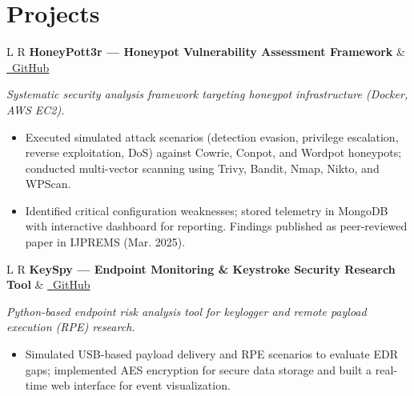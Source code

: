 \documentclass[10pt,a4paper]{article}
\begin{document}
\section{Projects}

\noindent
\begin{tabularx}{\textwidth}{L R}
  \textbf{HoneyPott3r --- Honeypot Vulnerability Assessment Framework} & \href{https://github.com/3rr0r-505/HoneyPott3r}{\textcolor{accent}{\faGithub\ GitHub}} \\
\end{tabularx}
\vspace{1pt}
\textit{\small Systematic security analysis framework targeting honeypot infrastructure (Docker, AWS EC2).}
\begin{itemize}[leftmargin=3.5ex, itemsep=2.5pt, topsep=3pt]
  \small
  \item Executed simulated attack scenarios (detection evasion, privilege escalation, reverse exploitation, DoS) against Cowrie, Conpot, and Wordpot honeypots; conducted multi-vector scanning using Trivy, Bandit, Nmap, Nikto, and WPScan.
  \item Identified critical configuration weaknesses; stored telemetry in MongoDB with interactive dashboard for reporting. Findings published as peer-reviewed paper in IJPREMS (Mar. 2025).
\end{itemize}

\vspace{5pt}
\noindent
\begin{tabularx}{\textwidth}{L R}
  \textbf{KeySpy --- Endpoint Monitoring \& Keystroke Security Research Tool} & \href{https://github.com/3rr0r-505/KeySpy}{\textcolor{accent}{\faGithub\ GitHub}} \\
\end{tabularx}
\vspace{1pt}
\textit{\small Python-based endpoint risk analysis tool for keylogger and remote payload execution (RPE) research.}
\begin{itemize}[leftmargin=3.5ex, itemsep=2.5pt, topsep=3pt]
  \small
  \item Simulated USB-based payload delivery and RPE scenarios to evaluate EDR gaps; implemented AES encryption for secure data storage and built a real-time web interface for event visualization.
\end{itemize}
\end{document}
